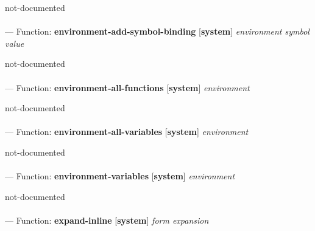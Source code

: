 \begin{adjustwidth}{5em}{5em}
not-documented
\end{adjustwidth}

\paragraph{}
\label{SYSTEM:ENVIRONMENT-ADD-SYMBOL-BINDING}
--- Function: \textbf{environment-add-symbol-binding} [\textbf{system}] \textit{environment symbol value}

\begin{adjustwidth}{5em}{5em}
not-documented
\end{adjustwidth}

\paragraph{}
\label{SYSTEM:ENVIRONMENT-ALL-FUNCTIONS}
--- Function: \textbf{environment-all-functions} [\textbf{system}] \textit{environment}

\begin{adjustwidth}{5em}{5em}
not-documented
\end{adjustwidth}

\paragraph{}
\label{SYSTEM:ENVIRONMENT-ALL-VARIABLES}
--- Function: \textbf{environment-all-variables} [\textbf{system}] \textit{environment}

\begin{adjustwidth}{5em}{5em}
not-documented
\end{adjustwidth}

\paragraph{}
\label{SYSTEM:ENVIRONMENT-VARIABLES}
--- Function: \textbf{environment-variables} [\textbf{system}] \textit{environment}

\begin{adjustwidth}{5em}{5em}
not-documented
\end{adjustwidth}

\paragraph{}
\label{SYSTEM:EXPAND-INLINE}
--- Function: \textbf{expand-inline} [\textbf{system}] \textit{form expansion}

